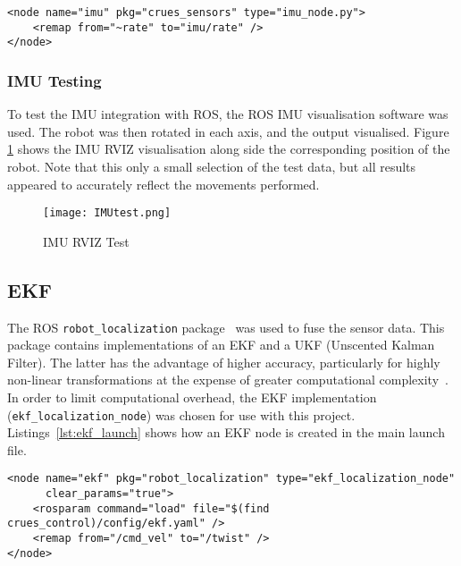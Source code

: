 \begin{lstlisting}[caption={IMU node in ROS launch file}, label={lst:imu_launch}, style=xml]
<node name="imu" pkg="crues_sensors" type="imu_node.py">
    <remap from="~rate" to="imu/rate" />
</node>
\end{lstlisting}

\subsubsection{IMU Testing}\label{soft/odometry/imu/test}

To test the IMU integration with ROS, the ROS IMU visualisation software was used.
The robot was then rotated in each axis, and the output visualised.
Figure \ref{fig:imu_test} shows the IMU RVIZ visualisation along side the
corresponding position of the robot. Note that this only a small selection
of the test data, but all results appeared to accurately reflect the
movements performed.

\begin{figure}[!ht]
	\centering
	\texttt{[image: IMUtest.png]}
	\caption{IMU RVIZ Test}\label{fig:imu_test}
\end{figure}

\subsection{EKF}\label{soft/odometry/ekf}

The ROS \verb|robot_localization| package~\cite{RosRobotLocalization} was used
to fuse the sensor data. This package contains implementations of
an EKF and a UKF (Unscented Kalman Filter). The latter has the advantage of higher
accuracy, particularly for highly non-linear transformations at the expense of
greater computational complexity~\cite{wan_unscented_2000}. In order to limit
computational overhead, the EKF implementation (\verb|ekf_localization_node|) was
chosen for use with this project. Listings~\ref{lst:ekf_launch} shows how an EKF
node is created in the main launch file.

\begin{lstlisting}[caption={EKF node in ROS launch file}, label={lst:ekf_launch}, style=xml]
<node name="ekf" pkg="robot_localization" type="ekf_localization_node"
      clear_params="true">
    <rosparam command="load" file="$(find crues_control)/config/ekf.yaml" />
    <remap from="/cmd_vel" to="/twist" />
</node>
\end{lstlisting}

